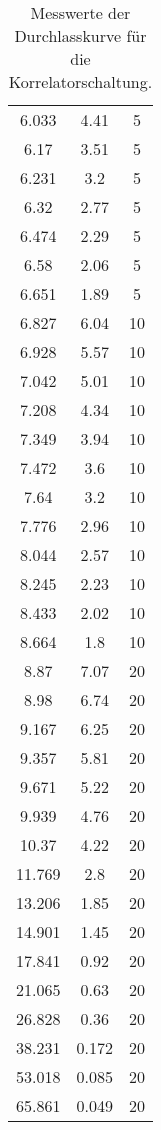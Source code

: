 \begin{table}[h]
\begin{tabular}[t]{S S S}
  6.033 & 4.41 & 5\\
  6.17 & 3.51 & 5\\
  6.231 & 3.2 & 5\\
  6.32 & 2.77 & 5\\
  6.474 & 2.29 & 5\\
  6.58 & 2.06 & 5\\
  6.651 & 1.89 & 5\\
  6.827 & 6.04 & 10\\
  6.928 & 5.57 & 10\\
  7.042 & 5.01 & 10\\
  7.208 & 4.34 & 10\\
  7.349 & 3.94 & 10\\
  7.472 & 3.6 & 10\\
  7.64 & 3.2 & 10\\
  7.776 & 2.96 & 10\\
  8.044 & 2.57 & 10\\
  8.245 & 2.23 & 10\\
  8.433 & 2.02 & 10\\
  8.664 & 1.8 & 10\\
  8.87 & 7.07 & 20\\
  8.98 & 6.74 & 20\\
  9.167 & 6.25 & 20\\
  9.357 & 5.81 & 20\\
  9.671 & 5.22 & 20\\
  9.939 & 4.76 & 20\\
  10.37 & 4.22 & 20\\
  11.769 & 2.8 & 20\\
  13.206 & 1.85 & 20\\
  14.901 & 1.45 & 20\\
  17.841 & 0.92 & 20\\
  21.065 & 0.63 & 20\\
  26.828 & 0.36 & 20\\
  38.231 & 0.172 & 20\\
  53.018 & 0.085 & 20\\
  65.861 & 0.049 & 20\\
  \bottomrule
\end{tabular}
  \caption{Messwerte der Durchlasskurve für die Korrelatorschaltung.}
  \label{tab:durchlasskorr}
\end{table}

